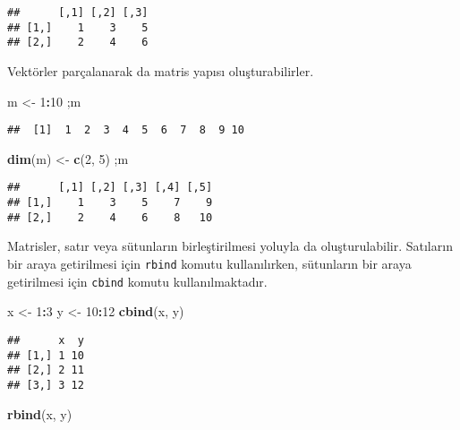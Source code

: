 \documentclass[
]{book}
\newenvironment{Shaded}{\begin{snugshade}}{\end{snugshade}}
\newcommand{\DecValTok}[1]{\textcolor[rgb]{0.00,0.00,0.81}{#1}}
\newcommand{\KeywordTok}[1]{\textcolor[rgb]{0.13,0.29,0.53}{\textbf{#1}}}
\newcommand{\NormalTok}[1]{#1}
\newcommand{\OperatorTok}[1]{\textcolor[rgb]{0.81,0.36,0.00}{\textbf{#1}}}
\newcommand{\StringTok}[1]{\textcolor[rgb]{0.31,0.60,0.02}{#1}}
\begin{document}
\begin{verbatim}
##      [,1] [,2] [,3]
## [1,]    1    3    5
## [2,]    2    4    6
\end{verbatim}

Vektörler parçalanarak da matris yapısı oluşturabilirler.

\begin{Shaded}
\begin{Highlighting}[]
\NormalTok{m <-}\StringTok{ }\DecValTok{1}\OperatorTok{:}\DecValTok{10}\NormalTok{ ;m}
\end{Highlighting}
\end{Shaded}

\begin{verbatim}
##  [1]  1  2  3  4  5  6  7  8  9 10
\end{verbatim}

\begin{Shaded}
\begin{Highlighting}[]
\KeywordTok{dim}\NormalTok{(m) <-}\StringTok{ }\KeywordTok{c}\NormalTok{(}\DecValTok{2}\NormalTok{, }\DecValTok{5}\NormalTok{) ;m}
\end{Highlighting}
\end{Shaded}

\begin{verbatim}
##      [,1] [,2] [,3] [,4] [,5]
## [1,]    1    3    5    7    9
## [2,]    2    4    6    8   10
\end{verbatim}

Matrisler, satır veya sütunların birleştirilmesi yoluyla da oluşturulabilir. Satıların bir araya getirilmesi için \texttt{rbind} komutu kullanılırken, sütunların bir araya getirilmesi için \texttt{cbind} komutu kullanılmaktadır.

\begin{Shaded}
\begin{Highlighting}[]
\NormalTok{x <-}\StringTok{ }\DecValTok{1}\OperatorTok{:}\DecValTok{3}
\NormalTok{y <-}\StringTok{ }\DecValTok{10}\OperatorTok{:}\DecValTok{12}
\KeywordTok{cbind}\NormalTok{(x, y)}
\end{Highlighting}
\end{Shaded}

\begin{verbatim}
##      x  y
## [1,] 1 10
## [2,] 2 11
## [3,] 3 12
\end{verbatim}

\begin{Shaded}
\begin{Highlighting}[]
\KeywordTok{rbind}\NormalTok{(x, y)}
\end{Highlighting}
\end{Shaded}
\end{document}
